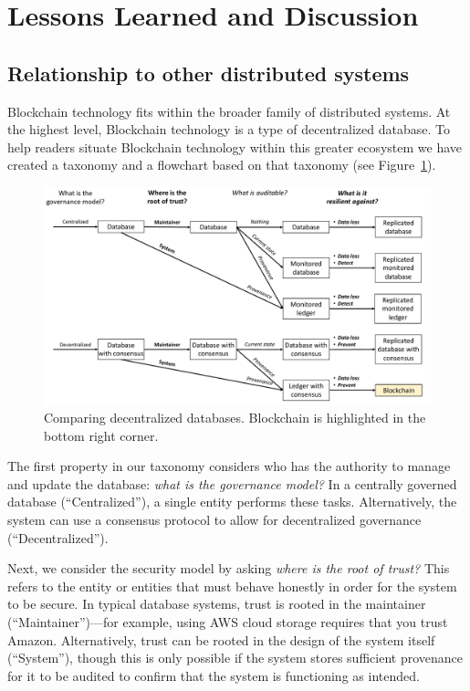 \section{Lessons Learned and Discussion}

\subsection{Relationship to other distributed systems}
Blockchain technology fits within the broader family of distributed systems.
At the highest level, Blockchain technology is a type of decentralized database.
To help readers situate Blockchain technology within this greater ecosystem we have created a taxonomy and a flowchart based on that taxonomy (see Figure~\ref{fig:blockchainFlowchart}).

\begin{figure}
	\centering
	\includegraphics[width=\textwidth]{figures/BlockchainFlowchart}
	\caption{Comparing decentralized databases. Blockchain is highlighted in the bottom right corner.}
	\label{fig:blockchainFlowchart}
\end{figure}

The first property in our taxonomy considers who has the authority to manage and update the database: \emph{what is the governance model?} In a centrally governed database (``Centralized''), a single entity performs these tasks. Alternatively, the system can use a consensus protocol to allow for decentralized governance (``Decentralized'').

Next, we consider the security model by asking \emph{where is the root of trust?}
This refers to the entity or entities that must behave honestly in order for the system to be secure.
In typical database systems, trust is rooted in the maintainer (``Maintainer'')---for example, using AWS cloud storage requires that you trust Amazon.
Alternatively, trust can be rooted in the design of the system itself (``System''), though this is only possible if the system stores sufficient provenance for it to be audited to confirm that the system is functioning as intended.


